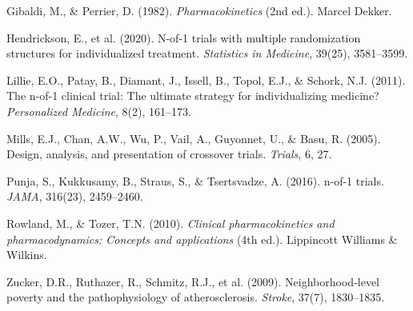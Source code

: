\documentclass[11pt,a4paper]{article}
\begin{document}
Gibaldi, M., \& Perrier, D. (1982). \textit{Pharmacokinetics} (2nd ed.). Marcel Dekker.

Hendrickson, E., et al. (2020). N-of-1 trials with multiple randomization structures for individualized treatment. \textit{Statistics in Medicine}, 39(25), 3581--3599.

Lillie, E.O., Patay, B., Diamant, J., Issell, B., Topol, E.J., \& Schork, N.J. (2011). The n-of-1 clinical trial: The ultimate strategy for individualizing medicine? \textit{Personalized Medicine}, 8(2), 161--173.

Mills, E.J., Chan, A.W., Wu, P., Vail, A., Guyonnet, U., \& Basu, R. (2005). Design, analysis, and presentation of crossover trials. \textit{Trials}, 6, 27.

Punja, S., Kukkusamy, B., Straus, S., \& Tsertsvadze, A. (2016). n-of-1 trials. \textit{JAMA}, 316(23), 2459--2460.

Rowland, M., \& Tozer, T.N. (2010). \textit{Clinical pharmacokinetics and pharmacodynamics: Concepts and applications} (4th ed.). Lippincott Williams \& Wilkins.

Zucker, D.R., Ruthazer, R., Schmitz, R.J., et al. (2009). Neighborhood-level poverty and the pathophysiology of atherosclerosis. \textit{Stroke}, 37(7), 1830--1835.
\end{document}
